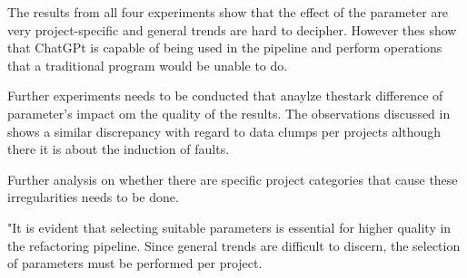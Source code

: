 The results from all four experiments show that the effect of the parameter are very project-specific and general trends are hard to decipher. However thes show that ChatGPt is capable of being used in the pipeline and perform operations that a traditional program would be unable to do.

Further experiments needs to be conducted that anaylze thestark difference of parameter's impact om the quality of the results. The observations discussed in  \cite{hallCodeSmellsHave2014} shows a similar discrepancy with regard to data clumps per projects although there it is about the induction of faults.

Further analysis on whether there are specific project categories that cause these irregularities needs to be done. 

"It is evident that selecting suitable parameters is essential for higher quality in the refactoring pipeline. Since general trends are difficult to discern,  the selection of parameters must be performed per project.